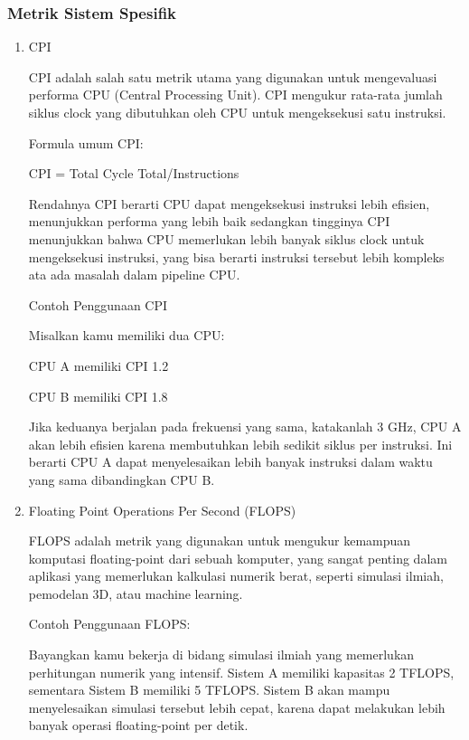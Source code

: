 \documentclass[12pt]{article}
\begin{document}
\subsubsection{Metrik Sistem Spesifik}
\begin{enumerate}
    \item CPI
    \par CPI adalah salah satu metrik utama yang digunakan untuk mengevaluasi performa CPU (Central Processing Unit). CPI mengukur rata-rata jumlah siklus clock yang dibutuhkan oleh CPU untuk mengeksekusi satu instruksi.
    \par Formula umum CPI: 
    \par CPI = Total Cycle Total/Instructions
    \par Rendahnya CPI berarti CPU dapat mengeksekusi instruksi lebih efisien, menunjukkan performa yang lebih baik sedangkan tingginya CPI menunjukkan bahwa CPU memerlukan lebih banyak siklus clock untuk mengeksekusi instruksi, yang bisa berarti instruksi tersebut lebih kompleks ata ada masalah dalam pipeline CPU.
    \par Contoh Penggunaan CPI
    \par Misalkan kamu memiliki dua CPU: 
    \par CPU A memiliki CPI 1.2 
    \par CPU B memiliki CPI 1.8 
    \par Jika keduanya berjalan pada frekuensi yang sama, katakanlah 3 GHz, CPU A akan lebih efisien karena membutuhkan lebih sedikit siklus per instruksi. Ini berarti CPU A dapat menyelesaikan lebih banyak instruksi dalam waktu yang sama dibandingkan CPU B.

    \item Floating Point Operations Per Second (FLOPS)
    \par FLOPS adalah metrik yang digunakan untuk mengukur
    kemampuan komputasi floating-point dari sebuah
    komputer, yang sangat penting dalam aplikasi yang
    memerlukan kalkulasi numerik berat, seperti simulasi
    ilmiah, pemodelan 3D, atau machine learning.
    \par Contoh Penggunaan FLOPS:
    \par Bayangkan kamu bekerja di bidang simulasi ilmiah yang memerlukan perhitungan numerik yang intensif. Sistem A memiliki kapasitas 2 TFLOPS, sementara Sistem B memiliki 5 TFLOPS. Sistem B akan mampu menyelesaikan simulasi tersebut lebih cepat, karena dapat melakukan lebih banyak operasi floating-point per detik.


\end{enumerate}
\end{document}
